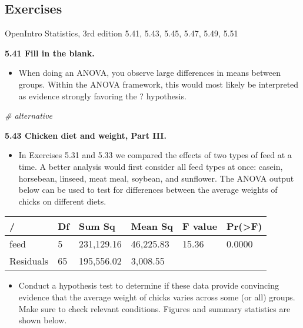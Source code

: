 \documentclass[]{book}
\newenvironment{Shaded}{\begin{snugshade}}{\end{snugshade}}
\newcommand{\CommentTok}[1]{\textcolor[rgb]{0.56,0.35,0.01}{\textit{#1}}}
\providecommand{\tightlist}{%
  \setlength{\itemsep}{0pt}\setlength{\parskip}{0pt}}
\begin{document}
\hypertarget{exercises-5}{%
\subsection*{Exercises}\label{exercises-5}}

OpenIntro Statistics, 3rd edition
5.41, 5.43, 5.45, 5.47, 5.49, 5.51

\textbf{5.41 Fill in the blank.}

\begin{itemize}
\tightlist
\item
  When doing an ANOVA, you observe large differences in means between groups. Within the ANOVA framework, this would most likely be interpreted as evidence strongly favoring the ? hypothesis.
\end{itemize}

\begin{Shaded}
\begin{Highlighting}[]
\CommentTok{# alternative}
\end{Highlighting}
\end{Shaded}

\textbf{5.43 Chicken diet and weight, Part III.}

\begin{itemize}
\tightlist
\item
  In Exercises 5.31 and 5.33 we compared the effects of two types of feed at a time. A better analysis would first consider all feed types at once: casein, horsebean, linseed, meat meal, soybean, and sunflower. The ANOVA output below can be used to test for differences between the average weights of chicks on different diets.
\end{itemize}

\begin{longtable}[]{@{}llllll@{}}
\toprule
/ & Df & Sum Sq & Mean Sq & F value & Pr(\textgreater{}F)\tabularnewline
\midrule
\endhead
feed & 5 & 231,129.16 & 46,225.83 & 15.36 & 0.0000\tabularnewline
Residuals & 65 & 195,556.02 & 3,008.55 & &\tabularnewline
\bottomrule
\end{longtable}

\begin{itemize}
\tightlist
\item
  Conduct a hypothesis test to determine if these data provide convincing evidence that the average weight of chicks varies across some (or all) groups. Make sure to check relevant conditions. Figures and summary statistics are shown below.
\end{itemize}
\end{document}
